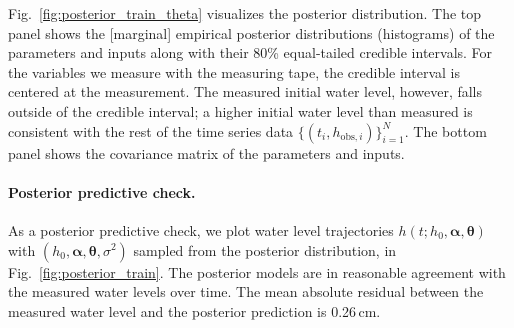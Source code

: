 \documentclass[openacc]{rsproca_new}%
\newcommand\thedata {$\{(t_i,h_{\text{obs}, i})\}_{i=1}^{N}$\xspace}
\newcommand\themodel {$h(t; h_0, \boldsymbol \alpha, \boldsymbol\theta)$\xspace}
\newcommand\thevars{h_0, \boldsymbol \alpha, \boldsymbol \theta, \sigma^2}
\begin{document}
Fig.~\ref{fig:posterior_train_theta} visualizes the posterior distribution. 
The top panel shows the [marginal] empirical posterior distributions (histograms) of the parameters and inputs along with their 80\% equal-tailed credible intervals. 
For the variables we measure with the measuring tape, the credible interval is centered at the measurement. 
The measured initial water level, however, falls outside of the credible interval; a higher initial water level than measured is consistent with the rest of the time series data \thedata.
The bottom panel shows the covariance matrix of the parameters and inputs. 


\paragraph{Posterior predictive check.} As a posterior predictive check, we plot water level trajectories \themodel with $(\thevars)$ sampled from the posterior distribution, in Fig.~\ref{fig:posterior_train}. 
The posterior models are in reasonable agreement with the measured water levels over time. The mean absolute residual between the measured water level and the posterior prediction is 0.26\,cm.
\end{document}
